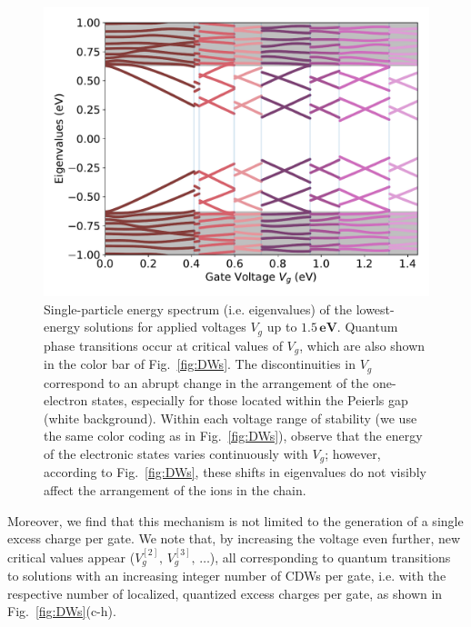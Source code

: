 \documentclass[10pt,a4paper]{article}
\begin{document}
%
\begin{figure}
    \centering
    \includegraphics[scale=0.7]{figures/eigenenergies.pdf}
    \caption{ Single-particle energy spectrum (i.e. eigenvalues) of the lowest-energy solutions for applied voltages $V_{g}$ up to $1.5 \, \textbf{eV}$. Quantum phase transitions occur at critical values of $V_{g}$, which are also shown in the color bar of Fig.~\ref{fig:DWs}. The discontinuities in $V_{g}$ correspond to an abrupt change in the arrangement of the one-electron states, especially for those located within the Peierls gap (white background). Within each voltage range of stability (we use the same color coding as in Fig.~\ref{fig:DWs}), observe that the energy of the electronic states varies continuously with $V_{g}$; however, according to Fig.~\ref{fig:DWs}, these shifts in eigenvalues do not visibly affect the arrangement of the ions in the chain.}
    \label{fig:eigenenergies}
\end{figure}
%
Moreover, we find that this mechanism is not limited to the generation of a single excess charge per gate. We note that, by increasing the voltage even further, new critical values appear (${V_{g}^{[2]}, \, V_{g}^{[3]}, \, \dots}$), all corresponding to quantum transitions to solutions with an increasing integer number of CDWs per gate, i.e. with the respective number of localized, quantized excess charges per gate, as shown in Fig.~\ref{fig:DWs}(c-h).
\end{document}
